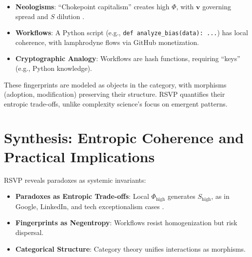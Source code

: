 \documentclass{article}
\begin{document}
\begin{itemize}
    \item \textbf{Neologisms}: ``Chokepoint capitalism'' creates high $\Phi$, with $\mathbf{v}$ governing spread and $S$ dilution \cite{giblin2022chokepoint,doctorow2023internetcon}.
    \item \textbf{Workflows}: A Python script (e.g., \texttt{def analyze\_bias(data): ...}) has local coherence, with lamphrodyne flows via GitHub monetization.
    \item \textbf{Cryptographic Analogy}: Workflows are hash functions, requiring ``keys'' (e.g., Python knowledge).
\end{itemize}

These fingerprints are modeled as objects in the category, with morphisms (adoption, modification) preserving their structure. RSVP quantifies their entropic trade-offs, unlike complexity science’s focus on emergent patterns.

\section{Synthesis: Entropic Coherence and Practical Implications}
\label{sec:synthesis}

RSVP reveals paradoxes as systemic invariants:

\begin{itemize}
    \item \textbf{Paradoxes as Entropic Trade-offs}: Local $\Phi_{\text{high}}$ generates $S_{\text{high}}$, as in Google, LinkedIn, and tech exceptionalism cases \cite{doctorow2023internetcon,amos2024}.
    \item \textbf{Fingerprints as Negentropy}: Workflows resist homogenization but risk dispersal.
    \item \textbf{Categorical Structure}: Category theory unifies interactions as morphisms.
\end{itemize}
\end{document}
